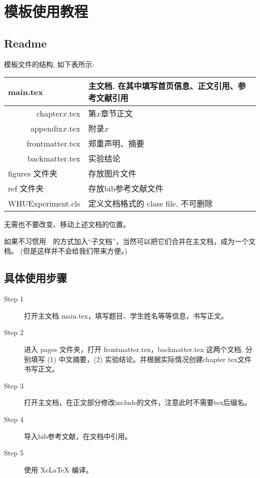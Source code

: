 \chapter{模板使用教程}
 
\section{Readme}

模板文件的结构, 如下表所示:
 \begin{table}[ht]\centering
\begin{tabular}{r|r|l}
	\hline\hline
	\multicolumn{2}{l|}{main.tex }       & 主文档. 在其中填写首页信息、正文引用、参考文献引用             \\ \hline
                                    & chapter$x$.tex & 第$x$章节正文            \\ \cline{2-3}
                                    & appendix$x$.tex & 附录$x$             \\ \cline{2-3}
    \raisebox{1em}{pages 文件夹}   & frontmatter.tex & 郑重声明、摘要               \\ \cline{2-3}
	 &  backmatter.tex & 实验结论                      \\ \hline
	\multicolumn{2}{l|}{figures 文件夹}                  & 存放图片文件               \\ \hline
    \multicolumn{2}{l|}{ref 文件夹}                  & 存放bib参考文献文件                   \\ \hline
	\multicolumn{2}{l|}{WHUExperiment.cls }             & 定义文档格式的 class file, 不可删除 \\ \hline\hline
\end{tabular}
\end{table}

无需也不要改变、移动上述文档的位置。

如果不习惯用~\verb||~的方式加入“子文档”，当然可以把它们合并在主文档，成为一个文档。
({\kaishu 但是这样并不会给我们带来方便。})

 \section{具体使用步骤}

 \begin{description}
  \item[Step 1]  打开主文档 main.tex，填写题目、学生姓名等等信息，书写正文。
  \item[Step 2]  进入 pages 文件夹，打开 frontmatter.tex，backmatter.tex 这两个文档,
  分别填写 (1) 中文摘要，(2) 实验结论。并根据实际情况创建chapter tex文件书写正文。
  \item[Step 3]  打开主文档，在正文部分修改include的文件，注意此时不需要tex后缀名。
  \item[Step 4]  导入bib参考文献，在文档中引用。 
  \item[Step 5]  使用 XeLaTeX 编译。
\end{description}

